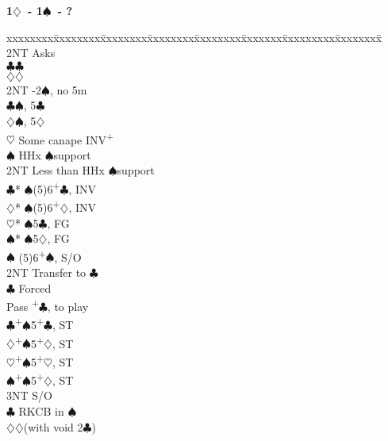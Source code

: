 \documentclass[10pt]{article}
\renewcommand{\c}{$\clubsuit$}
\renewcommand{\d}{$\diamondsuit$}
\newcommand{\h}{$\heartsuit$}
\newcommand{\s}{$\spadesuit$}
\newcommand{\p}{\textsuperscript{+}}
\newenvironment{bidtable}[1][]
{\textbf{#1}
  \begin{adjustwidth}{1em}{}
    \addvspace{2pt}
    \begin{tabbing}
      xxxxxxxx\=xxxxxxxx\=xxxxxxxx\=xxxxxxxx\=xxxxxxxx\=xxxxxxx\=xxxxxxxxx\=xxxxxxxx\=\kill}
{\end{tabbing}\end{adjustwidth}\bigskip}%
\begin{document}
\begin{bidtable}[1\d\ - 1\s\ - ?]
     \>      \>     \> 2NT  \> Asks                                  \\
     \>      \>     \>      \c   {}\c                          \\
     \>      \>     \>      \d   {}\d                          \\
     \>      \> 2NT -2\s, no 5m                                  \\
     \>      \c {}\s, 5\c                                      \\
     \>      \d {}\s, 5\d                                      \\
     \h  \> Some canape INV\p                                    \\
     \>      \s \> HHx \s support                                \\
     \>      \> 2NT \> Less than HHx \s support                      \\
     \>      \>     \c* {}\s (5)6\p\c, INV                     \\
     \>      \>     \d* {}\s (5)6\p\d, INV                     \\
     \>      \>     \h* {}\s 5\c, FG                           \\
     \>      \>     \s* {}\s 5\d, FG                           \\
     \s  \> (5)6\p\s, S/O                                        \\
     \> 2NT  \> Transfer to \c                                       \\
     \>      \c \> Forced                                        \\
     \>      \>     \> Pass \p\c, to play                        \\
     \c  {}\p\s 5\p\c, ST                                      \\
     \d  {}\p\s 5\p\d, ST                                      \\
     \h  {}\p\s 5\p\h, ST                                      \\
     \s  {}\p\s 5\p\d, ST                                      \\
     \> 3NT  \> S/O                                                  \\
     \c  \> RKCB in \s                                           \\
     \d  {}\d (with void 2\c)                                  \\

\end{bidtable}
\end{document}
